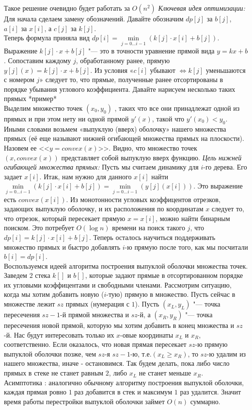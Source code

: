 \documentclass[a4paper, 12pt]{article}
\theoremstyle{plain}
\theoremstyle{definition}
\theoremstyle{remark}
\begin{document}
Такое решение очевидно будет работать за $O(n^2)$
\textit{Ключевая идея оптимизации:} Для начала сделаем замену обозначений. Давайте обозначим $dp[j]$ за $b[j]$, $a[i]$ за $x[i]$, а $c[j]$ за $k[j]$.\\
Теперь формула приняла вид $dp[i]=\min\limits_{j=0\dots i-1}(k[j]\cdot x[i]+b[j])$. Выражение $k[j]\cdot x+b[j]$ "--- это в точности уравнение прямой вида $y=kx+b$.
Сопоставим каждому $j$, обработанному ранее, прямую $y[j](x)=k[j]\cdot x+b[j]$. Из условия «$c[i]$ убывают $\Leftrightarrow k[j]$ уменьшаются с номером $j$» следует то, что прямые, полученные ранее отсортированы в порядке убывания углового коэффициента. Давайте нарисуем несколько таких прямых *пример*\\
Выделим множество точек $(x_0,y_0)$ , таких что все они принадлежат одной из прямых и при этом нету ни одной прямой $y'(x)$, такой что $y'(x_0)<y_0$. Иными словами возьмем «выпуклую (вверх) оболочку» нашего множества прямых (её еще называют нижней огибающей множества прямых на плоскости). Назовем ее <<$y=convex(x)$>>. Видно, что множество точек $(x,convex(x))$ представляет собой выпуклую вверх функцию.
\textit{Цель нижней огибающей множества прямых:} Пусть мы считаем динамику для $i$-го дерева. Его задает $x[i]$. Итак, нам нужно для данного $x[i]$ найти $\min\limits_{j=0\dots i-1}(k[j]\cdot x[i]+b[j])=\min\limits_{j=0\dots i-1}(y[j](x[i]))$. Это выражение есть $convex(x[i])$. Из монотонности угловых коэффицентов отрезков, задающих выпуклую оболочку, и их расположения по координатам $x$ следует то, что отрезок, который пересекает прямую $x=x[i]$, можно найти бинарным поиском. Это потребует $O(\log n)$ времени на поиск такого $j$, что $dp[i]=k[j]\cdot x[i]+b[j]$. Теперь осталось научиться поддерживать множество прямых и быстро добавлять $i$-ю прямую после того, как мы посчитали $b[i]=dp[i]$.\\
Воспользуемся идеей алгоритма построения выпуклой оболочки множества точек. Заведем $2$ стека $k[]$ и $b[]$, которые задают прямые в отсортированном порядке их угловыми коэффицентами и свободными членами. Рассмотрим ситуацию, когда мы хотим добавить новую ($i$-тую) прямую в множество. Пусть сейчас в множестве лежит $sz$ прямых (нумерация с $1$). Пусть $(x_L,y_L)$ "--- точка пересечения $sz-1$-й прямой множества и $sz$-й, а $(x_R,y_R) $ "--- точка пересечения новой прямой, которую мы хотим добавить в конец множества и $sz$-й. Нас будут интересовать только их $x$-овые координаты $x_L$ и $x_R$, соответственно. Если оказалось, что новая прямая пересекает $sz$-ю прямую выпуклой оболочки позже, чем $sz$-я $sz-1$-ю, т.е.$ (x_L\geq x_R)$, то $sz$-ю удалим из нашего множества, иначе - остановимся. Так будем делать, пока либо число прямых в стеке не станет равным $2$, либо $x_L$ не станет меньше $x_R$.\\
Асимптотика : аналогично обычному алгоритму построения выпуклой оболочки, каждая прямая ровно $1$ раз добавится в стек и максимум $1$ раз удалится. Значит время работы перестройки выпуклой оболочки займет $O(n)$ суммарно.
\end{document}
